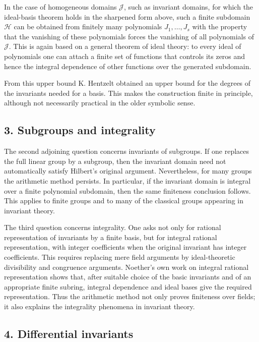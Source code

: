 \documentclass[11pt]{article}
\begin{document}
In the case of homogeneous domains $\mathcal J$, such as invariant domains, for which the ideal-basis theorem holds in the sharpened form above, such a finite subdomain $\mathcal H$ can be obtained from finitely many polynomials $J_1,\ldots,J_s$ with the property that the vanishing of these polynomials forces the vanishing of all polynomials of $\mathcal J$. This is again based on a general theorem of ideal theory: to every ideal of polynomials one can attach a finite set of functions that controls its zeros and hence the integral dependence of other functions over the generated subdomain.

From this upper bound K. Hentzelt obtained an upper bound for the degrees of the invariants needed for a basis. This makes the construction finite in principle, although not necessarily practical in the older symbolic sense.

\subsection{3. Subgroups and integrality}

The second adjoining question concerns invariants of subgroups. If one replaces the full linear group by a subgroup, then the invariant domain need not automatically satisfy Hilbert's original argument. Nevertheless, for many groups the arithmetic method persists. In particular, if the invariant domain is integral over a finite polynomial subdomain, then the same finiteness conclusion follows. This applies to finite groups and to many of the classical groups appearing in invariant theory.

The third question concerns integrality. One asks not only for rational representation of invariants by a finite basis, but for integral rational representation, with integer coefficients when the original invariant has integer coefficients. This requires replacing mere field arguments by ideal-theoretic divisibility and congruence arguments. Noether's own work on integral rational representation shows that, after suitable choice of the basic invariants and of an appropriate finite subring, integral dependence and ideal bases give the required representation. Thus the arithmetic method not only proves finiteness over fields; it also explains the integrality phenomena in invariant theory.

\subsection{4. Differential invariants}
\end{document}
